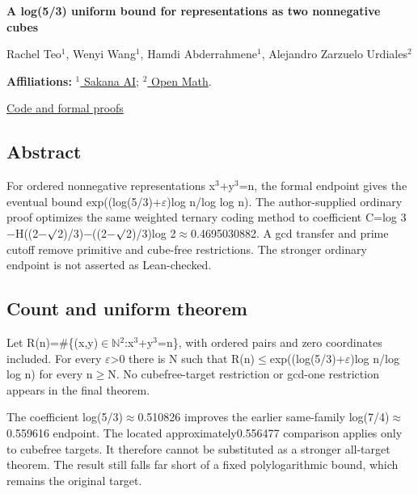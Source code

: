 \documentclass[11pt,a4paper]{article}
\begin{document}
{\LARGE\bfseries A log(5/3) uniform bound for representations as two nonnegative cubes\par}\medskip
{\small Rachel Teo\ensuremath{^1}, Wenyi Wang\ensuremath{^1}, Hamdi Abderrahmene\ensuremath{^1}, Alejandro Zarzuelo Urdiales\ensuremath{^2}\par}\medskip
{\small\textbf{Affiliations:} \href{https://sakana.ai/}{\ensuremath{^1} Sakana AI}; \href{https://rsihouse.ai/openmath}{\ensuremath{^2} Open Math}.\par}

{\small\href{https://github.com/alejandrozu/openmath-2026-judging}{Code and formal proofs}\par}

\subsection{Abstract}
For ordered nonnegative representations x\ensuremath{^3}+y\ensuremath{^3}=n, the formal endpoint gives the eventual bound exp((log(5/3)+\ensuremath{\varepsilon})log n/log log n). The author-supplied ordinary proof optimizes the same weighted ternary coding method to coefficient C=log 3\ensuremath{-}H((2\ensuremath{-}\ensuremath{\surd}2)/3)\ensuremath{-}((2\ensuremath{-}\ensuremath{\surd}2)/3)log 2\ensuremath{\approx}0.4695030882. A gcd transfer and prime cutoff remove primitive and cube-free restrictions. The stronger ordinary endpoint is not asserted as Lean-checked.

\subsection{Count and uniform theorem}
Let R(n)=\#\{(x,y)\ensuremath{\in}\ensuremath{\mathbb{N}}\ensuremath{^2}:x\ensuremath{^3}+y\ensuremath{^3}=n\}, with ordered pairs and zero coordinates included. For every \ensuremath{\varepsilon}>0 there is N such that R(n)\ensuremath{\leq}exp((log(5/3)+\ensuremath{\varepsilon})log n/log log n) for every n\ensuremath{\geq}N. No cubefree-target restriction or gcd-one restriction appears in the final theorem.

The coefficient log(5/3)\ensuremath{\approx}0.510826 improves the earlier same-family log(7/4)\ensuremath{\approx}0.559616 endpoint. The located approximately0.556477 comparison applies only to cubefree targets. It therefore cannot be substituted as a stronger all-target theorem. The result still falls far short of a fixed polylogarithmic bound, which remains the original target.
\end{document}

